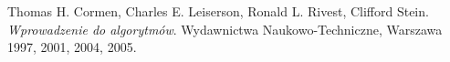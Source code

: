 \begin{thebibliography}{999999}

    Thomas H. Cormen, Charles E. Leiserson, Ronald L. Rivest, Clifford Stein.
    \emph{Wprowadzenie do algorytmów}.
    Wydawnictwa Naukowo-Techniczne, Warszawa 1997, 2001, 2004, 2005.

\end{thebibliography}
